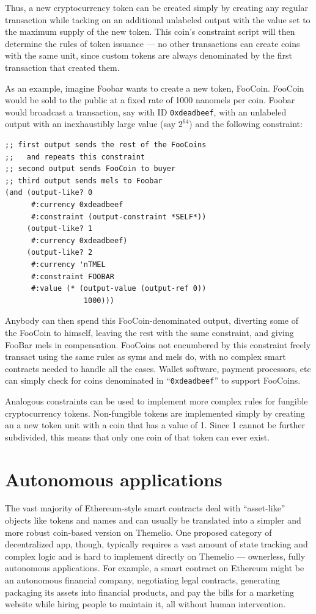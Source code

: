 \documentclass[headinclude,12pt]{scrbook}
\begin{document}
Thus, a new cryptocurrency token can be created simply by creating any regular transaction while tacking on an additional unlabeled output with the value set to the maximum supply of the new token. This coin's constraint script will then determine the rules of token issuance --- no other transactions can create coins with the same unit, since custom tokens are always denominated by the first transaction that created them.

As an example, imagine Foobar wants to create a new token, FooCoin. FooCoin would be sold to the public at a fixed rate of 1000 nanomels per coin. Foobar would broadcast a transaction, say with ID \texttt{0xdeadbeef}, with an unlabeled output with an inexhaustibly large value (say $2^{64}$) and the following constraint:

\begin{lstlisting}
;; first output sends the rest of the FooCoins
;;   and repeats this constraint
;; second output sends FooCoin to buyer
;; third output sends mels to Foobar
(and (output-like? 0
      #:currency 0xdeadbeef
      #:constraint (output-constraint *SELF*))
     (output-like? 1
      #:currency 0xdeadbeef)
     (output-like? 2
      #:currency 'nTMEL
      #:constraint FOOBAR
      #:value (* (output-value (output-ref 0))
                  1000)))
\end{lstlisting}

Anybody can then spend this FooCoin-denominated output, diverting some of the FooCoin to himself, leaving the rest with the same constraint, and giving FooBar mels in compensation. FooCoins not encumbered by this constraint freely transact using the same rules as syms and mels do, with no complex smart contracts needed to handle all the cases. Wallet software, payment processors, etc can simply check for coins denominated in ``\texttt{0xdeadbeef}'' to support FooCoins.

Analogous constraints can be used to implement more complex rules for fungible cryptocurrency tokens. Non-fungible tokens are implemented simply by creating an a new token unit with a coin that has a value of 1. Since 1 cannot be further subdivided, this means that only one coin of that token can ever exist.

\section{Autonomous applications}

The vast majority of Ethereum-style smart contracts deal with ``asset-like'' objects like tokens and names and can usually be translated into a simpler and more robust coin-based version on Themelio. One proposed category of decentralized app, though, typically requires a vast amount of state tracking and complex logic and is hard to implement directly on Themelio --- ownerless, fully autonomous applications. For example, a smart contract on Ethereum might be an autonomous financial company, negotiating legal contracts, generating packaging its assets into financial products, and pay the bills for a marketing website while hiring people to maintain it, all without human intervention.
\end{document}
